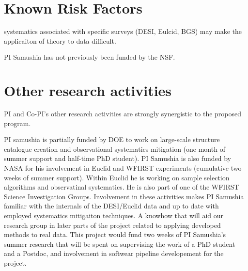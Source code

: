 



\section{Known Risk Factors}






systematics associated with specific surveys (DESI, Eulcid, BGS) may make the
applicaiton of theory to data difficult. 



PI Samushia has not previously been funded by the NSF.

\section{Other research activities}

PI and Co-PI's other research activities are strongly synergistic to the
proposed program.

PI samushia is partially funded by DOE to work on large-scale structure
catalogue creation and observational systematics mitigation (one month of
summer support and half-time PhD student). PI Samushia is also funded by NASA
for his involvement in Euclid and WFIRST experiments (cumulative two weeks of
summer support). Within Euclid he is working on sample selection algorithms
and observatinal systematics. He is also part of one of the WFIRST Science
Investigation Groups. Involvement in these activities makes PI Samushia
familiar with  the internals of the DESI/Euclid data and up to date with
employed systematics mitigaiton techniques. A knowhow that will aid our
research group in later parts of the project related to applying  developed
methods to real data. This project would fund two weeks of PI Samushia's
summer research that will be spent on supervising the work of a PhD student
and a Postdoc, and involvement in softwear pipeline developement for the
project.



